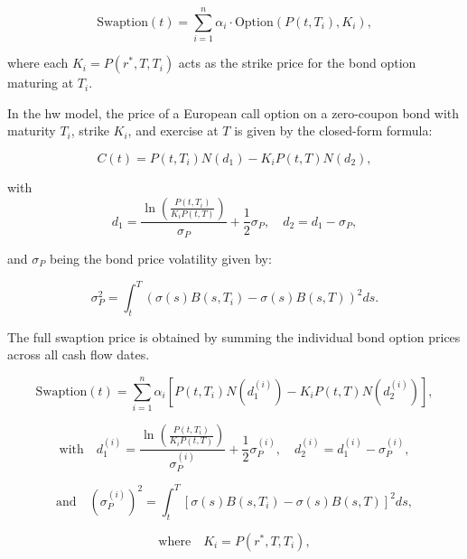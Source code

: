 \begin{equation}
	\text{Swaption}(t) = \sum_{i=1}^n \alpha_i \cdot \text{Option}(P(t, T_i), K_i),
\end{equation}

where each \( K_i = P(r^*, T, T_i) \) acts as the strike price for the bond option maturing at \( T_i \).

In the \ac{hw} model, the price of a European call option on a zero-coupon bond with maturity \( T_i \), strike \( K_i \), and exercise at \( T \) is given by the closed-form formula:

\begin{equation}
	C(t) = P(t, T_i) N(d_1) - K_i P(t, T) N(d_2),
\end{equation}

with
\begin{equation}
	d_1 = \frac{\ln\left( \frac{P(t, T_i)}{K_i P(t, T)} \right)}{\sigma_P} + \frac{1}{2} \sigma_P, \quad
	d_2 = d_1 - \sigma_P,
\end{equation}

and \( \sigma_P \) being the bond price volatility given by:

\begin{equation}
	\sigma_P^2 = \int_t^T \left( \sigma(s) B(s, T_i) - \sigma(s) B(s, T) \right)^2 ds.
\end{equation}

The full swaption price is obtained by summing the individual bond option prices across all cash flow dates.

\begin{equation}
	\text{Swaption}(t) = \sum_{i=1}^n \alpha_i \left[ P(t, T_i) N(d_1^{(i)}) - K_i P(t, T) N(d_2^{(i)}) \right],
\end{equation}

\begin{equation}
	\text{with} \quad d_1^{(i)} = \frac{\ln\left( \frac{P(t, T_i)}{K_i P(t, T)} \right)}{\sigma_P^{(i)}} + \frac{1}{2} \sigma_P^{(i)}, \quad d_2^{(i)} = d_1^{(i)} - \sigma_P^{(i)},
\end{equation}

\begin{equation}
	\text{and} \quad \left( \sigma_P^{(i)} \right)^2 = \int_t^T \left[ \sigma(s) B(s, T_i) - \sigma(s) B(s, T) \right]^2 ds,
\end{equation}

\begin{equation}
	\text{where} \quad K_i = P(r^*, T, T_i),
\end{equation}


